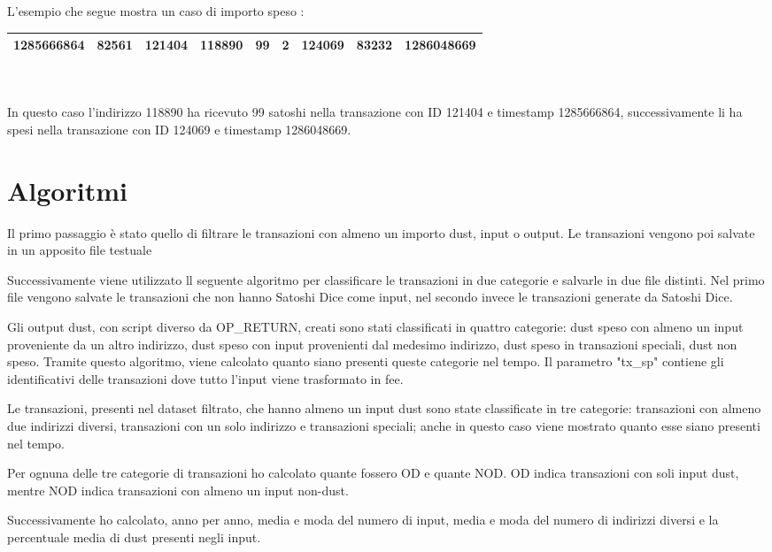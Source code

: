 L'esempio che segue mostra un caso di importo speso :\\
\begin{tabular}{|r|r|r|r|r|r|r|r|r|}
\toprule
1285666864 &    82561 & 121404 &  118890 &      99 &           2 &       124069 &       83232 &      1286048669\\
\bottomrule
\end{tabular}\\\\
In questo caso l'indirizzo 118890 ha ricevuto 99 satoshi nella transazione con ID 121404 e timestamp 1285666864, successivamente li ha spesi nella transazione con ID 124069 e timestamp 1286048669.\\
\section{Algoritmi}
Il primo passaggio è stato quello di filtrare le transazioni con almeno un importo dust, input o output. Le transazioni vengono poi salvate in un apposito file testuale  

Successivamente viene utilizzato ll seguente algoritmo per classificare le transazioni in due categorie e salvarle in due file distinti.
Nel primo file vengono salvate le transazioni che non hanno Satoshi Dice come input, nel secondo invece le transazioni generate da Satoshi Dice.

Gli output dust, con script diverso da OP\_RETURN, creati sono stati classificati in quattro categorie: dust speso con almeno un input proveniente da un altro indirizzo, dust speso con input provenienti dal medesimo indirizzo, dust speso in transazioni speciali, dust non speso. Tramite questo algoritmo, viene calcolato quanto siano presenti queste categorie nel tempo. Il parametro "tx\_sp" contiene gli identificativi delle transazioni dove tutto l'input viene trasformato in fee.

Le transazioni, presenti nel dataset filtrato, che hanno almeno un input dust sono state classificate in tre categorie: transazioni con almeno due indirizzi diversi, transazioni con un solo indirizzo e transazioni speciali; anche in questo caso viene mostrato quanto esse siano presenti nel tempo.

Per ognuna delle tre categorie di transazioni ho calcolato quante fossero OD e quante NOD. OD indica transazioni con soli input dust, mentre NOD indica transazioni con almeno un input non-dust.

Successivamente ho calcolato, anno per anno, media e moda del numero di input, media e moda del numero di indirizzi diversi e la percentuale media di dust presenti negli input.
